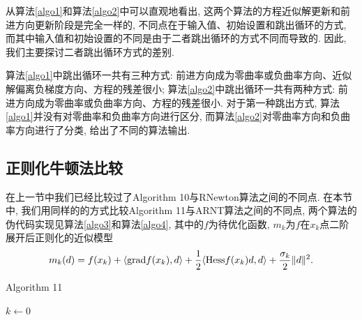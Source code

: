 \documentclass[UTF8]{ctexart}
\begin{document}
从算法\ref{algo1}和算法\ref{algo2}中可以直观地看出, 这两个算法的方程近似解更新和前进方向更新阶段是完全一样的, 不同点在于输入值、初始设置和跳出循环的方式, 而其中输入值和初始设置的不同是由于二者跳出循环的方式不同而导致的. 因此, 我们主要探讨二者跳出循环方式的差别. 

算法\ref{algo1}中跳出循环一共有三种方式: 前进方向成为零曲率或负曲率方向、近似解偏离负梯度方向、方程的残差很小; 算法\ref{algo2}中跳出循环一共有两种方式: 前进方向成为零曲率或负曲率方向、方程的残差很小. 对于第一种跳出方式, 算法\ref{algo1}并没有对零曲率和负曲率方向进行区分, 而算法\ref{algo2}对零曲率方向和负曲率方向进行了分类, 给出了不同的算法输出. 

\subsection{正则化牛顿法比较}

在上一节中我们已经比较过了Algorithm 10与RNewton算法之间的不同点. 在本节中, 我们用同样的的方式比较Algorithm 11与ARNT算法之间的不同点, 两个算法的伪代码实现见算法\ref{algo3}和算法\ref{algo4}, 其中的$f$为待优化函数, $m_k$为$f$在$x_k$点二阶展开后正则化的近似模型
\[m_k(d)=f(x_k)+\langle \textup{grad}f(x_k),d\rangle+\frac{1}{2}\langle \textup{Hess}f(x_k)d,d\rangle+\frac{\sigma_k}{2}\lVert d\rVert^2.\]

\begin{algorithm}[htb]
    \caption{Algorithm 11}\label{algo3}
    $k\leftarrow 0$\;
\end{algorithm}
\end{document}
